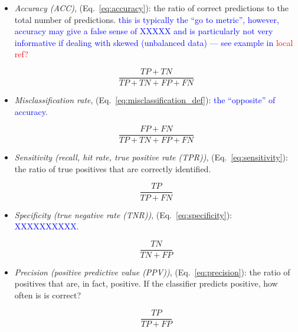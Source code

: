 \begin{itemize}
	
\item \textit{Accuracy (ACC)}, (Eq.~\ref{eq:accuracy}): the ratio of correct predictions to the total number of predictions. \textcolor{blue}{this is typically the ``go to metric'', however, accuracy may give a false sense of XXXXX and is particularly not very informative if dealing with skewed (unbalanced data) --- see example in \textcolor{red}{local ref?}}

\begin{equation}
{\frac{TP+TN}{TP+TN+FP+FN}}
\label{eq:accuracy}
\end{equation}

\item \textit{Misclassification rate}, (Eq.~\ref{eq:misclassification_def}): \textcolor{blue}{the ``opposite'' of accuracy}.

\begin{equation}
{\frac{FP+FN}{TP+TN+FP+FN}}
\label{eq:misclassification_def}
\end{equation}


\item \textit{Sensitivity (recall, hit rate, true positive rate (TPR))}, (Eq.~\ref{eq:sensitivity}): the ratio of true positives that are correctly identified.

\begin{equation}
{\frac{TP}{TP+FN}}
\label{eq:sensitivity}
\end{equation}

\item \textit{Specificity (true negative rate (TNR))}, (Eq.~\ref{eq:specificity}): \textcolor{blue}{XXXXXXXXXX}.

\begin{equation}
{\frac{TN}{TN+FP}}
\label{eq:specificity}
\end{equation}

\item \textit{Precision (positive predictive value (PPV))}, (Eq.~\ref{eq:precision}): the ratio of positives that are, in fact, positive. If the classifier predicts positive, how often is is correct?

\begin{equation}
{\frac{TP}{TP+FP}}
\label{eq:precision}
\end{equation}


\end{itemize}
